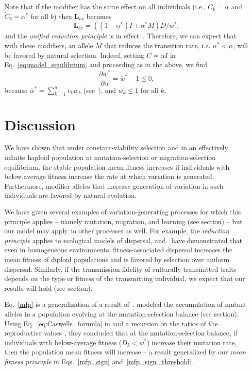 \documentclass[9pt, a4paper, twocolumn]{extarticle}
\newcommand{\cl}{\mathbf{L}}
\begin{document}
Note that if the modifier has the same effect on all individuals (i.e., $C_k = \alpha$ and $\tilde{C}_k = \alpha^*$ for all $k$) then $\cl_{ex}$ becomes
\begin{equation}
\cl_{ex} = ((1 - \alpha^*)I + \alpha^* M) D /\bar{w}^*,
\end{equation}  
and the \emph{unified reduction principle} is in effect~\cite[eqs. 65, 72]{Altenberg2017}.
Therefore, we can expect that with these modifiers, an allele $M$ that reduces the transition rate, i.e. $\alpha^* < \alpha$, will be favored by natural selection.
Indeed, setting $C = \alpha I$ in Eq.~\ref{eq:model_equilibrium} and proceeding as in the above, we find
$$
\frac{\partial \bar{w}^*}{\partial \alpha} = 
\bar{w}^* - 1 \le 0,
$$
because $\bar{w}^* = \sum_{k=1}^{n}{v_k w_k}$ (see~), and $w_k \le 1$ for all $k$.


\section*{Discussion}

We have shown that under constant-viability selection and in an effectively infinite haploid population at mutation-selection or migration-selection equilibrium, the stable population mean fitness increases if individuals with below-average fitness increase the rate at which variation is generated. Furthermore, modifier alleles that  increase generation of variation in such individuals are favored by natural evolution.

We have given several examples of variation-generating processes for which this principle applies -- namely mutation, migration, and learning (see \emph{} section) -- but our model may apply to other processes as well.
For example, the \emph{reduction principle} applies to ecological models of dispersal, and~\citet{Gueijman2013} have demonstrated that even in homogeneous environments, fitness-associated dispersal increases the mean fitness of diploid populations and is favored by selection over uniform dispersal.
Similarly, if the transmission fidelity of culturally-transmitted traits depends on the type or fitness of the transmitting individual, we expect that our results will hold (see \emph{} section).

Eq.~\ref{mfp} is a generalization of a result of~\citet[Eq.~4]{Ram2012}.
\citeauthor{Ram2012} modeled the accumulation of mutant alleles in a population evolving at the mutation-selection balance (see \emph{} section).
Using Eq.~\ref{eq:Caswells_formula} in  and a recursion on the ratios of the reproductive values \cite[see][eqs.~A5-6]{Ram2012}, they concluded that at the mutation-selection balance, if individuals with below-average fitness ($D_k < \bar{w}^*$) increase their mutation rate, then the population mean fitness will increase -- a result generalized by our \emph{mean fitness principle} in Eqs.~\ref{mfp_sign} and~\ref{mfp_sign_threshold}.
\end{document}
